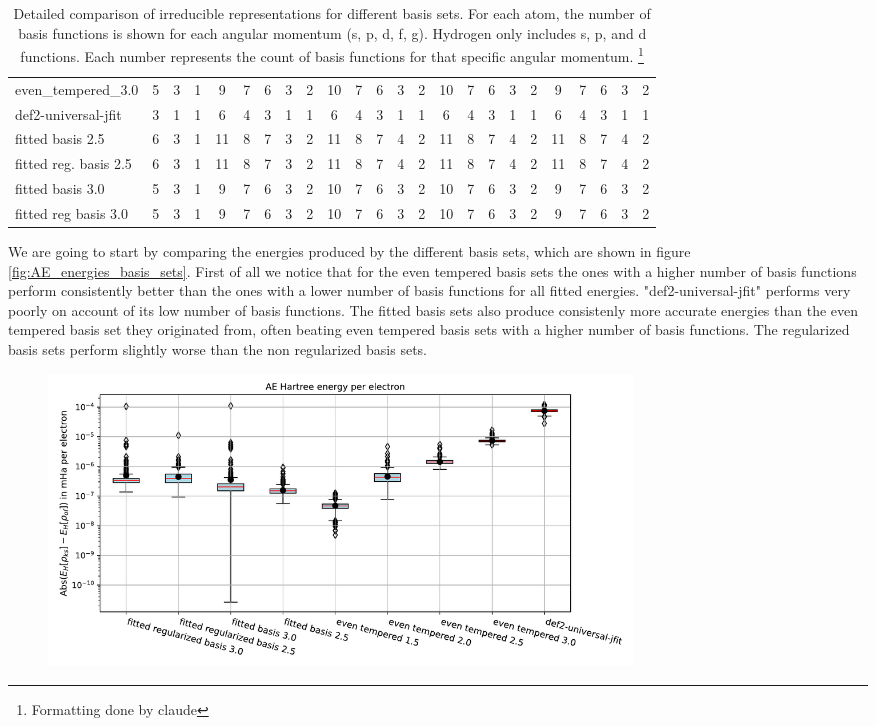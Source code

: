 {\begin{table}
\begin{tabular}{|l|ccc|ccccc|ccccc|ccccc|ccccc|}
even\_tempered\_3.0 & 5 & 3 & 1 & 9 & 7 & 6 & 3 & 2 & 10 & 7 & 6 & 3 & 2 & 10 & 7 & 6 & 3 & 2 & 9 & 7 & 6 & 3 & 2 \\
def2-universal-jfit & 3 & 1 & 1 & 6 & 4 & 3 & 1 & 1 & 6 & 4 & 3 & 1 & 1 & 6 & 4 & 3 & 1 & 1 & 6 & 4 & 3 & 1 & 1 \\
fitted basis 2.5 & 6 & 3 & 1 & 11 & 8 & 7 & 3 & 2 & 11 & 8 & 7 & 4 & 2 & 11 & 8 & 7 & 4 & 2 & 11 & 8 & 7 & 4 & 2 \\
fitted reg. basis 2.5 & 6 & 3 & 1 & 11 & 8 & 7 & 3 & 2 & 11 & 8 & 7 & 4 & 2 & 11 & 8 & 7 & 4 & 2 & 11 & 8 & 7 & 4 & 2 \\
fitted basis 3.0 & 5 & 3 & 1 & 9 & 7 & 6 & 3 & 2 & 10 & 7 & 6 & 3 & 2 & 10 & 7 & 6 & 3 & 2 & 9 & 7 & 6 & 3 & 2 \\
fitted reg basis 3.0 & 5 & 3 & 1 & 9 & 7 & 6 & 3 & 2 & 10 & 7 & 6 & 3 & 2 & 10 & 7 & 6 & 3 & 2 & 9 & 7 & 6 & 3 & 2 \\
\hline
\end{tabular}
\caption{Detailed comparison of irreducible representations for different basis sets. For each atom, the number of basis functions is shown for each angular momentum (s, p, d, f, g). Hydrogen only includes s, p, and d functions. Each number represents the count of basis functions for that specific angular momentum. \footnote{Formatting done by claude}}
\label{tab:basis-comparison-detailed}
\end{table}
We are going to start by comparing the energies produced by the different basis sets, which are shown in figure \ref{fig:AE_energies_basis_sets}. First of all we notice that for the even tempered basis sets the ones with a higher number of basis functions perform consistently better than the ones with a lower number of basis functions for all fitted energies. "def2-universal-jfit" performs very poorly on account of its low number of basis functions. The fitted basis sets also produce consistenly more accurate energies than the even tempered basis set they originated from, often beating even tempered basis sets with a higher number of basis functions. The regularized basis sets perform slightly worse than the non regularized basis sets. \\
\begin{figure}
    \centering
    \includegraphics[width=0.75\textwidth]{chapters/results/results_images/AE_hartree_energy_on_hartree+external_MOFDFT_for_different_basis_sets}

\end{figure}}
